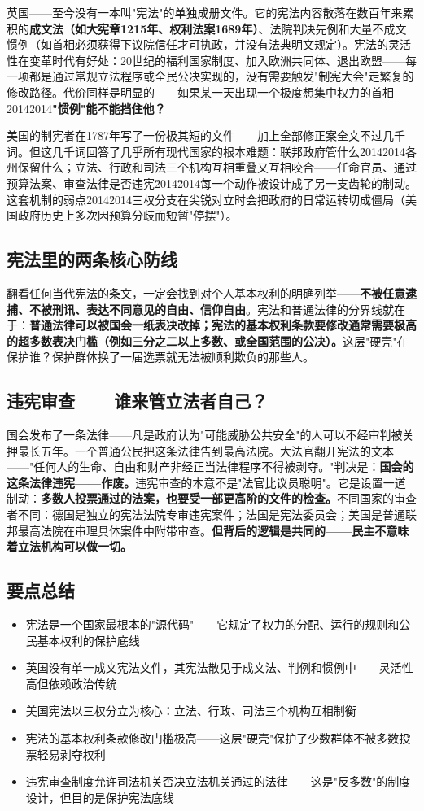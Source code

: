 \documentclass[a4paper,12pt]{ctexart}
\begin{document}
英国——至今没有一本叫"宪法"的单独成册文件。它的宪法内容散落在数百年来累积的\textbf{成文法（如大宪章1215年、权利法案1689年）}、法院判决先例和大量不成文惯例（如首相必须获得下议院信任才可执政，并没有法典明文规定）。宪法的灵活性在变革时代有好处：20世纪的福利国家制度、加入欧洲共同体、退出欧盟——每一项都是通过常规立法程序或全民公决实现的，没有需要触发"制宪大会"走繁复的修改路径。代价同样是明显的——如果某一天出现一个极度想集中权力的首相\u2014\u2014\textbf{"惯例"能不能挡住他？}

美国的制宪者在1787年写了一份极其短的文件——加上全部修正案全文不过几千词。但这几千词回答了几乎所有现代国家的根本难题：联邦政府管什么\u2014\u2014各州保留什么；立法、行政和司法三个机构互相重叠又互相咬合——任命官员、通过预算法案、审查法律是否违宪\u2014\u2014每一个动作被设计成了另一支齿轮的制动。这套机制的弱点\u2014\u2014三权分支在尖锐对立时会把政府的日常运转切成僵局（美国政府历史上多次因预算分歧而短暂"停摆"）。

\subsection*{宪法里的两条核心防线}

翻看任何当代宪法的条文，一定会找到对个人基本权利的明确列举——\textbf{不被任意逮捕、不被刑讯、表达不同意见的自由、信仰自由}。宪法和普通法律的分界线就在于：\textbf{普通法律可以被国会一纸表决改掉；宪法的基本权利条款要修改通常需要极高的超多数表决门槛（例如三分之二以上多数、或全国范围的公决）。}这层"硬壳"在保护谁？保护群体换了一届选票就无法被顺利欺负的那些人。

\subsection*{违宪审查——谁来管立法者自己？}

国会发布了一条法律——凡是政府认为"可能威胁公共安全"的人可以不经审判被关押最长五年。一个普通公民把这条法律告到最高法院。大法官翻开宪法的文本——"任何人的生命、自由和财产非经正当法律程序不得被剥夺。"判决是：\textbf{国会的这条法律违宪——作废。}违宪审查的本意不是"法官比议员聪明"。它是设置一道制动：\textbf{多数人投票通过的法案，也要受一部更高阶的文件的检查。}不同国家的审查者不同：德国是独立的宪法法院专审违宪案件；法国是宪法委员会；美国是普通联邦最高法院在审理具体案件中附带审查。\textbf{但背后的逻辑是共同的——民主不意味着立法机构可以做一切。}

\subsection*{要点总结}
\begin{itemize}
  \item 宪法是一个国家最根本的"源代码"——它规定了权力的分配、运行的规则和公民基本权利的保护底线
  \item 英国没有单一成文宪法文件，其宪法散见于成文法、判例和惯例中——灵活性高但依赖政治传统
  \item 美国宪法以三权分立为核心：立法、行政、司法三个机构互相制衡
  \item 宪法的基本权利条款修改门槛极高——这层"硬壳"保护了少数群体不被多数投票轻易剥夺权利
  \item 违宪审查制度允许司法机关否决立法机关通过的法律——这是"反多数"的制度设计，但目的是保护宪法底线
\end{itemize}
\end{document}
